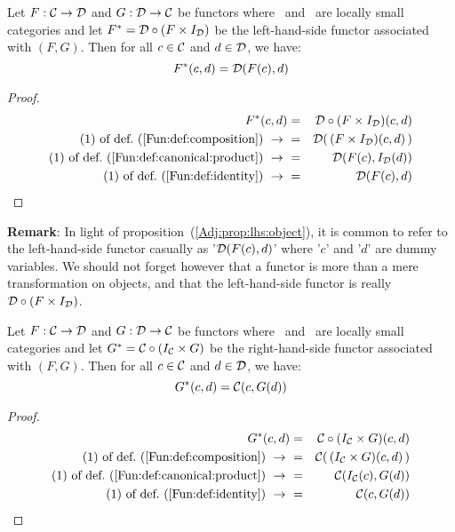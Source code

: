 \begin{prop}\label{Adj:prop:lhs:object}
    Let $F:\mbox{$\cal C$}\to\mbox{$\cal D$}$ and $G:\mbox{$\cal D$}\to\mbox{$\cal C$}$ be functors where \Cat\ and \Dat\ 
    are locally small categories and let $F^{*}=\mbox{$\cal D$}\circ(F\times I_{\cal D})$
    be the left-hand-side functor associated with $(F,G)$. Then for all $c\in\mbox{$\cal C$}$ 
    and $d\in\mbox{$\cal D$}$, we have:
        \[
            F^{*}(c,d) = \mbox{$\cal D$}(F(c),d)
        \]
\end{prop}
\begin{proof}
    \begin{eqnarray*}F^{*}(c,d)
        &=&\Dat\circ(F\times I_{\cal D})(c,d)\\
        \mbox{$(1)$ of def.~(\ref{Fun:def:composition})}\ \to\ 
        &=&\Dat(\,(F\times I_{\cal D})(c,d)\,)\\
        \mbox{$(1)$ of def.~(\ref{Fun:def:canonical:product})}\ \to\ 
        &=&\Dat(F(c),I_{\cal D}(d))\\
        \mbox{$(1)$ of def.~(\ref{Fun:def:identity})}\ \to\ 
        &=&\Dat(F(c),d)
    \end{eqnarray*}
\end{proof}

\noindent
{\bf Remark}: In light of proposition~(\ref{Adj:prop:lhs:object}), it is
common to refer to the left-hand-side functor casually as '$\mbox{$\cal D$}(F(c),d)$'
where '$c$' and '$d$' are dummy variables. We should not forget however
that a functor is more than a mere transformation on objects, and that 
the left-hand-side functor is really $\mbox{$\cal D$}\circ(F\times I_{\cal D})$.

\begin{prop}\label{Adj:prop:rhs:object}
    Let $F:\mbox{$\cal C$}\to\mbox{$\cal D$}$ and $G:\mbox{$\cal D$}\to\mbox{$\cal C$}$ be functors where \Cat\ and \Dat\ 
    are locally small categories and let $G^{*}=\mbox{$\cal C$}\circ(I_{\cal C}\times G)$
    be the right-hand-side functor associated with $(F,G)$. Then for all 
    $c\in\mbox{$\cal C$}$ and $d\in\mbox{$\cal D$}$, we have:
        \[
            G^{*}(c,d) = \mbox{$\cal C$}(c,G(d))
        \]
\end{prop}
\begin{proof}
    \begin{eqnarray*}G^{*}(c,d)
        &=&\Cat\circ(I_{\cal C}\times G)(c,d)\\
        \mbox{$(1)$ of def.~(\ref{Fun:def:composition})}\ \to\ 
        &=&\Cat(\,(I_{\cal C}\times G)(c,d)\,)\\
        \mbox{$(1)$ of def.~(\ref{Fun:def:canonical:product})}\ \to\ 
        &=&\Cat(I_{\cal C}(c),G(d))\\
        \mbox{$(1)$ of def.~(\ref{Fun:def:identity})}\ \to\ 
        &=&\Cat(c,G(d))
    \end{eqnarray*}
\end{proof}

